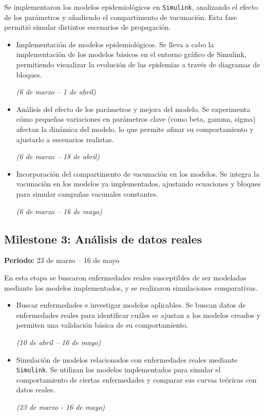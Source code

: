 Se implementaron los modelos epidemiológicos en \texttt{Simulink}, analizando el efecto de los parámetros y añadiendo el compartimento de vacunación. Esta fase permitió simular distintos escenarios de propagación.

\begin{itemize}
    \item Implementación de modelos epidemiológicos. Se lleva a cabo la implementación de los modelos básicos en el entorno gráfico de Simulink, permitiendo visualizar la evolución de las epidemias a través de diagramas de bloques. 

    
    \textit{(6 de marzo – 1 de abril)}
    \item Análisis del efecto de los parámetros y mejora del modelo. Se experimenta cómo pequeñas variaciones en parámetros clave (como beta, gamma, sigma) afectan la dinámica del modelo, lo que permite afinar su comportamiento y ajustarlo a escenarios realistas.  
    
    \textit{(6 de marzo – 18 de abril)}
    \item Incorporación del compartimento de vacunación en los modelos. Se integra la vacunación en los modelos ya implementados, ajustando ecuaciones y bloques para simular campañas vacunales constantes.  
    
    \textit{(6 de marzo – 16 de mayo)}
\end{itemize}

\subsection*{Milestone 3: Análisis de datos reales}
\textbf{Periodo:} 23 de marzo – 16 de mayo

En esta etapa se buscaron enfermedades reales susceptibles de ser modeladas mediante los modelos implementados, y se realizaron simulaciones comparativas.

\begin{itemize}
    \item Buscar enfermedades e investigar modelos aplicables.
    Se buscan datos de enfermedades reales para identificar cuáles se ajustan a los modelos creados y permiten una validación básica de su comportamiento. 
    
    \textit{(10 de abril – 16 de mayo)}
    \item Simulación de modelos relacionados con enfermedades reales mediante \texttt{Simulink}. Se utilizan los modelos implementados para simular el comportamiento de ciertas enfermedades y comparar sus curvas teóricas con datos reales.

    
    \textit{(23 de marzo - 16 de mayo)}
\end{itemize}

